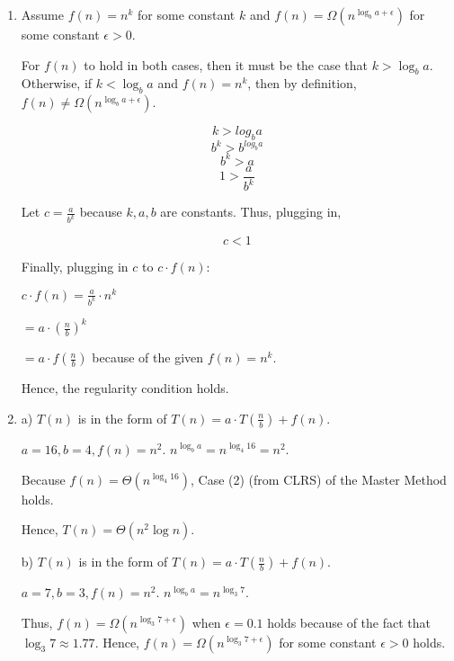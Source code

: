 \documentclass[a4paper]{report}
\begin{document}
\begin{enumerate}
    \item
        Assume $f(n) = n^k$ for some constant $k$ and $f(n) = \Omega(n^{\log_b a + \epsilon})$ for some constant $\epsilon > 0$.

        For $f(n)$ to hold in both cases, then it must be the case that $k > \log _{b} a$. Otherwise, if $k < \log _{b} a$ and
        $f(n) = n^k$, then by definition, $f(n) \neq \Omega(n^{\log_b a + \epsilon})$.

        $$ k > log_b a$$
        $$ b^k > b^{log_b a} $$
        $$ b^k > a $$
        $$ 1 > \frac{a}{b^k} $$

        Let $c = \frac{a}{b^k}$ because $k, a, b$ are constants.  Thus, plugging in,

        $$ c < 1 $$

        Finally, plugging in $c$ to $c \cdot f(n)$:

        $c \cdot f(n) = \frac{a}{b^k} \cdot n^k$

        $             = a \cdot (\frac{n}{b})^k$

        $             = a \cdot f(\frac{n}{b})$
        because of the given $f(n) = n^k$.

        Hence, the regularity condition holds. 

    \pagebreak
    \par
    \bigskip

    \item

      a) 
      $T(n)$ is in the form of $T(n) = a \cdot T(\frac{n}{b}) + f(n)$.

      $a = 16, b = 4, f(n) = n^2$. $n^{\log_b a} = n^{\log_4 16} = n^2$. 

      Because $f(n) = \Theta(n^{\log_4 16})$, Case (2) (from CLRS) of the Master Method holds. 

      Hence, $T(n) = \Theta(n^2 \log n)$. 


      \bigskip

      b) 
      $T(n)$ is in the form of $T(n) = a \cdot T(\frac{n}{b}) + f(n)$.

      $a = 7, b = 3, f(n) = n^2$. $n^{\log_b a} = n^{\log_3 7}$. 

      Thus, $f(n) = \Omega(n^{\log_3 7 + \epsilon})$ when $\epsilon=0.1$ holds because of the fact that
      $\log_3 7 \approx 1.77$. Hence, $f(n) = \Omega(n^{\log_3 7 + \epsilon})$ for some constant $\epsilon>0$ holds.


\end{enumerate}
\end{document}
